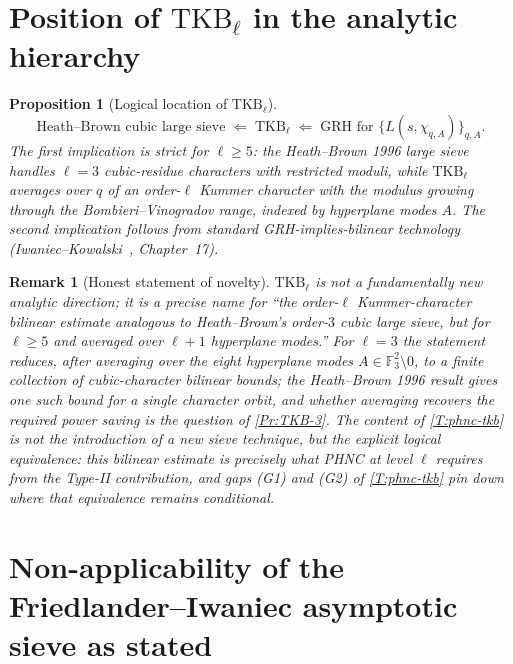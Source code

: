 \documentclass[11pt]{article}
\newtheorem{proposition}{Proposition}
\newtheorem{remark}{Remark}
\newcommand{\F}{\mathbb F}
\newcommand{\1}{\mathbf 1}
\begin{document}
\section{Position of \texorpdfstring{$\mathrm{TKB}_\ell$}{TKB\_ell} in the analytic hierarchy}

\begin{proposition}[Logical location of \(\mathrm{TKB}_\ell\)]\label{P:hierarchy}
\[
\text{Heath--Brown cubic large sieve}\;\Longleftarrow\;\mathrm{TKB}_\ell\;\Longleftarrow\;\text{GRH for }\{L(s,\chi_{q,A})\}_{q,A}.
\]
The first implication is strict for \(\ell\ge 5\): the Heath--Brown 1996 large sieve handles \(\ell=3\) cubic-residue characters with restricted moduli, while \(\mathrm{TKB}_\ell\) averages over \(q\) of an order-\(\ell\) Kummer character with the modulus growing through the Bombieri--Vinogradov range, indexed by hyperplane modes \(A\).  The second implication follows from standard GRH-implies-bilinear technology (Iwaniec--Kowalski~\cite{IK}, Chapter~17).
\end{proposition}

\begin{remark}[Honest statement of novelty]
\(\mathrm{TKB}_\ell\) is not a fundamentally new analytic direction; it is a precise name for ``the order-\(\ell\) Kummer-character bilinear estimate analogous to Heath--Brown's order-\(3\) cubic large sieve, but for \(\ell\ge 5\) and averaged over \(\ell+1\) hyperplane modes.''  For \(\ell=3\) the statement reduces, after averaging over the eight hyperplane modes \(A\in\F_3^2\setminus 0\), to a finite collection of cubic-character bilinear bounds; the Heath--Brown 1996 result gives one such bound for a single character orbit, and whether averaging recovers the required power saving is the question of \cref{Pr:TKB-3}.  The content of \cref{T:phnc-tkb} is not the introduction of a new sieve technique, but the explicit logical equivalence: \emph{this} bilinear estimate is precisely what PHNC at level \(\ell\) requires from the Type-II contribution, and gaps (G1) and (G2) of \cref{T:phnc-tkb} pin down where that equivalence remains conditional.
\end{remark}

\section{Non-applicability of the Friedlander--Iwaniec asymptotic sieve as stated}
\end{document}
